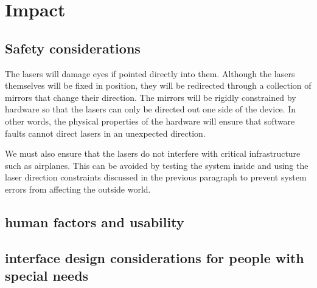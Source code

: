 \documentclass[10pt]{article}
\begin{document}
\begin{comment}
  | A fan                      | $10.93 | \href{http://www.digikey.com/product-detail/en/EFB0612HHA/603-1026-ND/1014357?WT.mc_id=IQ_7595_G_pla1014357}{Potential fan}                                               |   |
  | Mirror                     | $12.02 | \href{http://www.onlinemetals.com/merchant.cfm?pid=7895&step=4&id=735&Cj0KEQjwvve_BRDmg9Kt9ufO15EBEiQAKoc6qk8IH2ER5s-AwA1TZpkKCJNiQJXJGtpEh3BDggOUHxoaApnE8P8HAQ}{Mirror} |   |
  | Speaker Actuator           | $0.00  | Will be salvaged                                                                                                                                                          |   |
  | TOTAL                      | $76.27 |                                                                                                                                                                           |   |
\end{comment}

\section{Impact}
\subsection{Safety considerations}
The lasers will damage eyes if pointed directly into them.
Although the lasers themselves will be fixed in position, they will be redirected through a collection of mirrors that change their direction.
The mirrors will be rigidly constrained by hardware so that the lasers can only be directed out one side of the device.
In other words, the physical properties of the hardware will ensure that software faults cannot direct lasers in an unexpected direction.

We must also ensure that the lasers do not interfere with critical infrastructure such as airplanes.
This can be avoided by testing the system inside and using the laser direction constraints discussed in the previous paragraph to prevent system errors from affecting the outside world.
\subsection{human factors and usability}
\subsection{interface design considerations for people with special needs}
\end{document}
